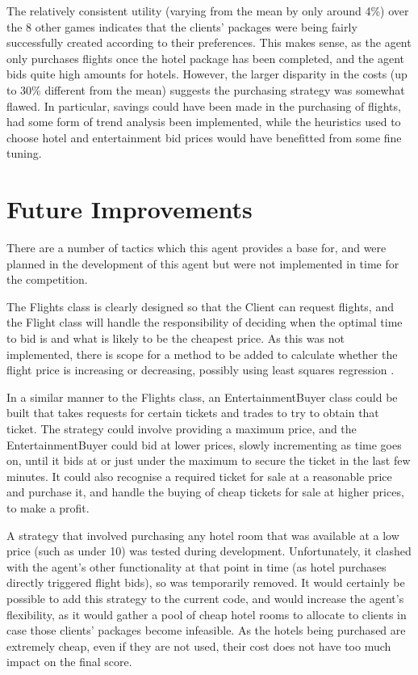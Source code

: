 \documentclass{acm_proc_article-sp}
\begin{document}
 The relatively consistent utility (varying from the mean by only around 4\%) over the 8 other games indicates that the clients' packages were being fairly successfully created according to their preferences.  This makes sense, as the agent only purchases flights once the hotel package has been completed, and the agent bids quite high amounts for hotels.  However, the larger disparity in the costs (up to 30\% different from the mean) suggests the purchasing strategy was somewhat flawed. In particular, savings could have been made in the purchasing of flights, had some form of trend analysis been implemented, while the heuristics used to choose hotel and entertainment bid prices would have benefitted from some fine tuning.
 
\section{Future Improvements}
 \label{future}
 There are a number of tactics which this agent provides a base for, and were planned in the development of this agent but were not implemented in time for the competition.
 
 The Flights class is clearly designed so that the Client can request flights, and the Flight class will handle the responsibility of deciding when the optimal time to bid is and what is likely to be the cheapest price.  As this was not implemented, there is scope for a method to be added to calculate whether the flight price is increasing or decreasing, possibly using least squares regression \cite{Vytelingum2007}.
 
 In a similar manner to the Flights class, an EntertainmentBuyer class could be built that takes requests for certain tickets and trades to try to obtain that ticket.  The strategy could involve providing a maximum price, and the EntertainmentBuyer could bid at lower prices, slowly incrementing as time goes on, until it bids at or just under the maximum to secure the ticket in the last few minutes.  It could also recognise a required ticket for sale at a reasonable price and purchase it, and handle the buying of cheap tickets for sale at higher prices, to make a profit.
 
 A strategy that involved purchasing any hotel room that was available at a low price (such as under 10) was tested during development.  Unfortunately, it clashed with the agent's other functionality at that point in time (as hotel purchases directly triggered flight bids), so was temporarily removed.  It would certainly be possible to add this strategy to the current code, and would increase the agent's flexibility, as it would gather a pool of cheap hotel rooms to allocate to clients in case those clients' packages become infeasible.  As the hotels being purchased are extremely cheap, even if they are not used, their cost does not have too much impact on the final score.
 
\end{document}
